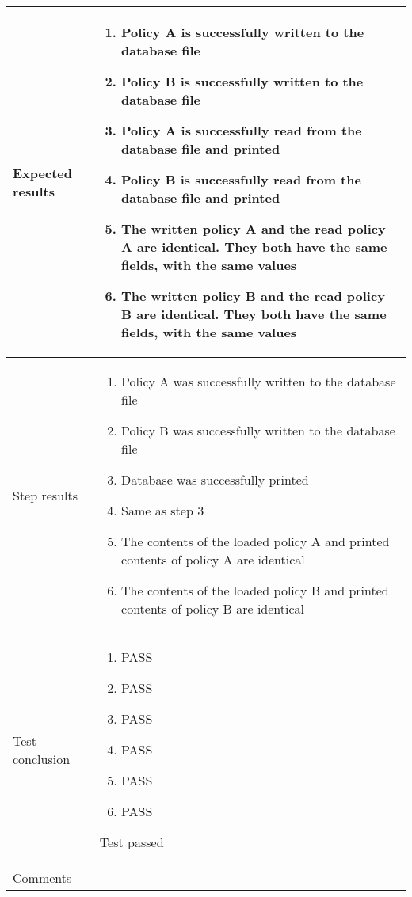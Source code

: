 \documentclass[10pt]{article}
\begin{document}
\begin{center}
\begin{longtable}{ | p{4cm} | p{10cm} | }
			Expected results &	\begin{enumerate}
							\item Policy A is successfully written to the database file
							\item Policy B is successfully written to the database file
							\item Policy A is successfully read from the database file and printed
							\item Policy B is successfully read from the database file and printed
							\item The written policy A and the read policy A are identical. They both have the same fields, with the same values
							\item The written policy B and the read policy B are identical. They both have the same fields, with the same values
						\end{enumerate}
							 \\  [3pt] \hline

			Step results & 	\begin{enumerate}
							\item Policy A was successfully written to the database file
							\item Policy B was successfully written to the database file
							\item Database was successfully printed
							\item Same as step 3
							\item The contents of the loaded policy A and printed contents of policy A are identical
							\item The contents of the loaded policy B and printed contents of policy B are identical
						\end{enumerate}
							 \\  [3pt] \hline

			Test conclusion & 	\begin{enumerate}
							\item PASS
							\item PASS
							\item PASS
							\item PASS
							\item PASS
							\item PASS
						\end{enumerate}
						Test passed \\  [3pt] \hline
			Comments &	- \\ [3pt] \hline
		\end{longtable}
	\end{center}
\end{document}
